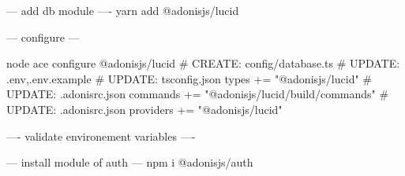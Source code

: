 --- add db module ----
yarn add  @adonisjs/lucid

--- configure ---

node ace configure @adonisjs/lucid
    # CREATE: config/database.ts
    # UPDATE: .env,.env.example
    # UPDATE: tsconfig.json { types += "@adonisjs/lucid" }
    # UPDATE: .adonisrc.json { commands += "@adonisjs/lucid/build/commands" }
    # UPDATE: .adonisrc.json { providers += "@adonisjs/lucid" }

---- validate environement variables ---- 


--- install module of auth ---
npm i @adonisjs/auth

